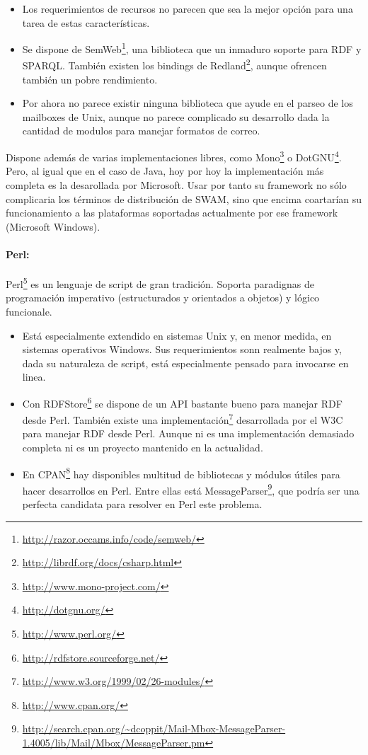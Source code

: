 \begin{itemize}
  \item Los requerimientos de recursos no parecen que sea la mejor opción para una tarea
	de estas características.
  \item Se dispone de SemWeb\footnote{\url{http://razor.occams.info/code/semweb/}}, una
	biblioteca que un inmaduro soporte para RDF y SPARQL. También existen los bindings 
	de Redland\footnote{\url{http://librdf.org/docs/csharp.html}}, aunque ofrencen también
	un pobre rendimiento.
  \item Por ahora no parece existir ninguna biblioteca que ayude en el parseo de los mailboxes 
	de Unix, aunque no parece complicado su desarrollo dada la cantidad de modulos para 
	manejar formatos de correo.
\end{itemize}

Dispone además de varias implementaciones libres, como 
Mono\footnote{\url{http://www.mono-project.com/}} o DotGNU\footnote{\url{http://dotgnu.org/}}.
Pero, al igual que en el caso de Java, hoy por hoy la implementación más completa es la
desarollada por Microsoft. Usar por tanto su framework no sólo complicaria los términos
de distribución de SWAM, sino que encima coartarían su funcionamiento a las plataformas
soportadas actualmente por ese framework (Microsoft Windows).


\paragraph{Perl:}Perl\footnote{\url{http://www.perl.org/}} es un lenguaje de script de 
gran tradición. Soporta paradignas de programación imperativo (estructurados y orientados 
a objetos) y lógico funcionale.

\begin{itemize}
  \item Está especialmente extendido en sistemas Unix y, en menor medida, en sistemas
	operativos Windows. Sus requerimientos sonn realmente bajos y, dada su naturaleza
	de script, está especialmente pensado para invocarse en linea.
  \item Con RDFStore\footnote{\url{http://rdfstore.sourceforge.net/}} se dispone de un 
	API bastante bueno para manejar RDF desde Perl. También existe una
	implementación\footnote{\url{http://www.w3.org/1999/02/26-modules/}} 
	desarrollada por el W3C para manejar RDF desde Perl. Aunque ni es una implementación
	demasiado completa ni es un proyecto mantenido en la actualidad.
  \item En CPAN\footnote{\url{http://www.cpan.org/}} hay disponibles multitud de bibliotecas
	y módulos útiles para hacer desarrollos en Perl. Entre ellas está
	MessageParser\footnote{\url{http://search.cpan.org/~dcoppit/Mail-Mbox-MessageParser-1.4005/lib/Mail/Mbox/MessageParser.pm}},
	que podría ser una perfecta candidata para resolver en Perl este problema.
\end{itemize}

